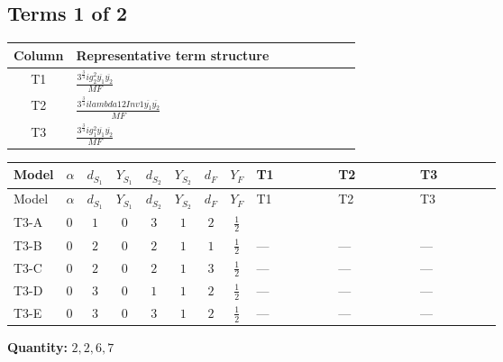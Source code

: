 \documentclass[8pt]{article}
\begin{document}
\begin{landscape}
\subsection*{Terms 1 of 2}
\begin{center}
\begin{tabular}{@{}c >{\raggedright\arraybackslash}p{0.82\linewidth}@{}}
\toprule
Column & Representative term structure \\
\midrule
T1 & \(\displaystyle \frac{3^{\frac{3}{4}} i g_{2}^{2} \overline{y_{1}} \overline{y_{2}}}{MF}\) \\
\midrule
T2 & \(\displaystyle \frac{3^{\frac{3}{4}} i lambda12Inv1 \overline{y_{1}} \overline{y_{2}}}{MF}\) \\
\midrule
T3 & \(\displaystyle \frac{3^{\frac{3}{4}} i g_{1}^{2} \overline{y_{1}} \overline{y_{2}}}{MF}\) \\
\midrule
\bottomrule
\end{tabular}
\end{center}
\smallskip
\tiny
\begin{longtable}{@{}llcccccc >{\raggedright\arraybackslash}p{0.21\linewidth} >{\raggedright\arraybackslash}p{0.21\linewidth} >{\raggedright\arraybackslash}p{0.21\linewidth}@{}}
\toprule
Model & $\alpha$ & $d_{S_1}$ & $Y_{S_1}$ & $d_{S_2}$ & $Y_{S_2}$ & $d_F$ & $Y_F$ & T1 & T2 & T3 \\
\midrule
\endfirsthead
\toprule
Model & $\alpha$ & $d_{S_1}$ & $Y_{S_1}$ & $d_{S_2}$ & $Y_{S_2}$ & $d_F$ & $Y_F$ & T1 & T2 & T3 \\
\midrule
\endhead
T3-A & $0$ & $1$ & $0$ & $3$ & $1$ & $2$ & $\frac{1}{2}$ & \scriptsize\adjustbox{max width=\linewidth}{$\begin{gathered} - \frac{17 \cdot 3^{\frac{3}{4}} i g_{2}^{2} \overline{y_{1}} \overline{y_{2}}}{24 MF}\end{gathered}$} & \scriptsize\adjustbox{max width=\linewidth}{$\begin{gathered} - \frac{3^{\frac{3}{4}} i lambda12Inv1 \overline{y_{1}} \overline{y_{2}}}{6 MF}\end{gathered}$} & \scriptsize\adjustbox{max width=\linewidth}{$\begin{gathered} - \frac{3^{\frac{3}{4}} i g_{1}^{2} \overline{y_{1}} \overline{y_{2}}}{8 MF}\end{gathered}$} \\
\midrule
T3-B & $0$ & $2$ & $0$ & $2$ & $1$ & $1$ & $\frac{1}{2}$ & --- & --- & --- \\
\midrule
T3-C & $0$ & $2$ & $0$ & $2$ & $1$ & $3$ & $\frac{1}{2}$ & --- & --- & --- \\
\midrule
T3-D & $0$ & $3$ & $0$ & $1$ & $1$ & $2$ & $\frac{1}{2}$ & --- & --- & --- \\
\midrule
T3-E & $0$ & $3$ & $0$ & $3$ & $1$ & $2$ & $\frac{1}{2}$ & --- & --- & --- \\
\midrule
\bottomrule
\end{longtable}
\clearpage
\noindent\textbf{Quantity: }$\mathrm{2,2,6,7}$\par\smallskip

\end{landscape}
\end{document}
